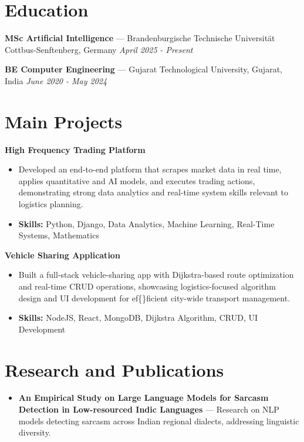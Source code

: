 \documentclass[a4paper,10pt]{article}
\begin{document}
\section*{Education}
\textbf{MSc Artificial Intelligence} — Brandenburgische Technische Universität Cottbus-Senftenberg, Germany \hfill \textit{April 2025 - Present}\par
\vspace{1.5pt}
\textbf{BE Computer Engineering} — Gujarat Technological University, Gujarat, India \hfill \textit{June 2020 - May 2024}\par

\section*{Main Projects}
\textbf{High Frequency Trading Platform}\par
\vspace{1pt}
\begin{itemize}
  \item Developed an end-to-end platform that scrapes market data in real time, applies quantitative and AI models, and executes trading actions, demonstrating strong data analytics and real-time system skills relevant to logistics planning.
  \item \textbf{Skills:} Python, Django, Data Analytics, Machine Learning, Real-Time Systems, Mathematics
\end{itemize}
\vspace{3pt}
\textbf{Vehicle Sharing Application}\par
\vspace{1pt}
\begin{itemize}
  \item Built a full-stack vehicle-sharing app with Dijkstra-based route optimization and real-time CRUD operations, showcasing logistics-focused algorithm design and UI development for ef\{\}ficient city-wide transport management.
  \item \textbf{Skills:} NodeJS, React, MongoDB, Dijkstra Algorithm, CRUD, UI Development
\end{itemize}

\section*{Research and Publications}
\begin{itemize}
\item \textbf{An Empirical Study on Large Language Models for Sarcasm Detection in Low-resourced Indic Languages} — Research on NLP models detecting sarcasm across Indian regional dialects, addressing linguistic diversity.
\end{itemize}
\end{document}

